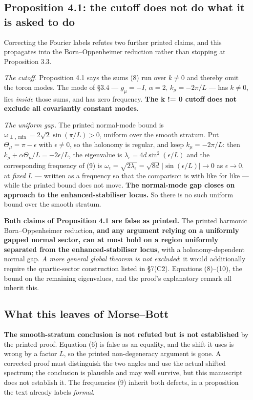 \documentclass[11pt]{article}
\begin{document}
\subsection{Proposition 4.1: the cutoff does not do what it is asked to do}

Correcting the Fourier labels refutes two further printed claims, and this propagates
into the Born--Oppenheimer reduction rather than stopping at Proposition 3.3.

\emph{The cutoff.} Proposition 4.1 says the sums (8) run over $k\neq0$ and thereby omit
the toron modes. The mode of \S3.4 --- $g_\mu=-I$, $\alpha=2$, $k_\mu=-2\pi/L$ --- has
$k\neq0$, lies \emph{inside} those sums, and has zero frequency. \textbf{The k != 0
cutoff does not exclude all covariantly constant modes.}

\emph{The uniform gap.} The printed normal-mode bound is
$\omega_{\perp,\min}=2\sqrt2\sin(\pi/L)>0$, uniform over the smooth stratum. Put
$\Theta_\mu=\pi-\epsilon$ with $\epsilon\neq0$, so the holonomy is regular, and keep
$k_\mu=-2\pi/L$: then $k_\mu+\alpha\Theta_\mu/L=-2\epsilon/L$, the eigenvalue is
$\lambda_\epsilon=4d\sin^2(\epsilon/L)$ and the corresponding frequency of (9) is
$\omega_\epsilon=\sqrt{2\lambda_\epsilon}=\sqrt{8d}\,|\sin(\epsilon/L)|\to0$ as
$\epsilon\to0$, at \emph{fixed} $L$ --- written as a frequency so that the comparison is
with like for like --- while the printed bound does not move. \textbf{The normal-mode gap closes on approach to the
enhanced-stabiliser locus.} So there is no such uniform bound over the smooth stratum.

\textbf{Both claims of Proposition 4.1 are false as printed.} The printed harmonic
Born--Oppenheimer reduction, \textbf{and any argument relying on a uniformly gapped
normal sector, can at most hold on a region uniformly separated from the
enhanced-stabiliser locus}, with a holonomy-dependent normal gap. \emph{A more general
global theorem is not excluded}: it would additionally require the quartic-sector
construction listed in \S7(C2). Equations (8)--(10), the bound on the remaining
eigenvalues, and the proof's explanatory remark all inherit this.

\subsection{What this leaves of Morse--Bott}

\textbf{The smooth-stratum conclusion is not refuted but is not established} by the
printed proof. Equation (6) is false as an equality, and the shift it uses is wrong by a
factor $L$, so the printed non-degeneracy argument is gone. A corrected proof must
distinguish the two angles and use the actual shifted spectrum; the conclusion is
plausible and may well survive, but this manuscript does not establish it. The
frequencies (9) inherit both defects, in a proposition the text already labels
\emph{formal}.
\end{document}
